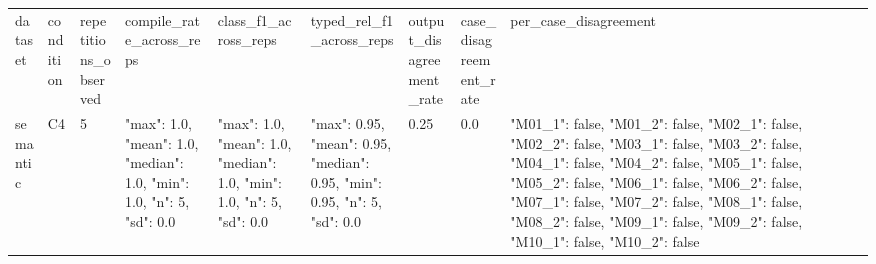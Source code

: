 \begin{tabular}{lllllllll}
dataset & condition & repetitions\_observed & compile\_rate\_across\_reps & class\_f1\_across\_reps & typed\_rel\_f1\_across\_reps & output\_disagreement\_rate & case\_disagreement\_rate & per\_case\_disagreement \\
semantic & C4 & 5 & {"max": 1.0, "mean": 1.0, "median": 1.0, "min": 1.0, "n": 5, "sd": 0.0} & {"max": 1.0, "mean": 1.0, "median": 1.0, "min": 1.0, "n": 5, "sd": 0.0} & {"max": 0.95, "mean": 0.95, "median": 0.95, "min": 0.95, "n": 5, "sd": 0.0} & 0.25 & 0.0 & {"M01\_1": false, "M01\_2": false, "M02\_1": false, "M02\_2": false, "M03\_1": false, "M03\_2": false, "M04\_1": false, "M04\_2": false, "M05\_1": false, "M05\_2": false, "M06\_1": false, "M06\_2": false, "M07\_1": false, "M07\_2": false, "M08\_1": false, "M08\_2": false, "M09\_1": false, "M09\_2": false, "M10\_1": false, "M10\_2": false} \\
\end{tabular}